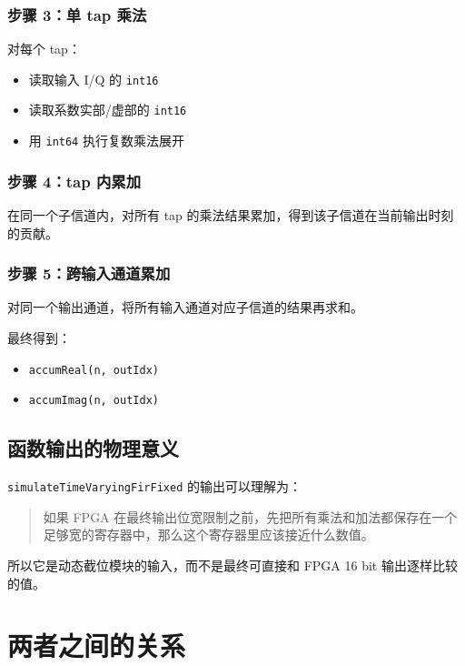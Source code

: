 \documentclass[12pt,a4paper]{article}
\begin{document}
\subsubsection{步骤 3：单 tap 乘法}

对每个 tap：

\begin{itemize}
\item 读取输入 I/Q 的 \texttt{int16}
\item 读取系数实部/虚部的 \texttt{int16}
\item 用 \texttt{int64} 执行复数乘法展开
\end{itemize}

\subsubsection{步骤 4：tap 内累加}

在同一个子信道内，对所有 tap 的乘法结果累加，得到该子信道在当前输出时刻的贡献。

\subsubsection{步骤 5：跨输入通道累加}

对同一个输出通道，将所有输入通道对应子信道的结果再求和。

最终得到：

\begin{itemize}
\item \texttt{accumReal(n, outIdx)}
\item \texttt{accumImag(n, outIdx)}
\end{itemize}

\subsection{函数输出的物理意义}

\texttt{simulateTimeVaryingFirFixed} 的输出可以理解为：

\begin{quote}
如果 FPGA 在最终输出位宽限制之前，先把所有乘法和加法都保存在一个足够宽的寄存器中，那么这个寄存器里应该接近什么数值。
\end{quote}

所以它是动态截位模块的输入，而不是最终可直接和 FPGA 16 bit 输出逐样比较的值。

\section{两者之间的关系}
\end{document}
